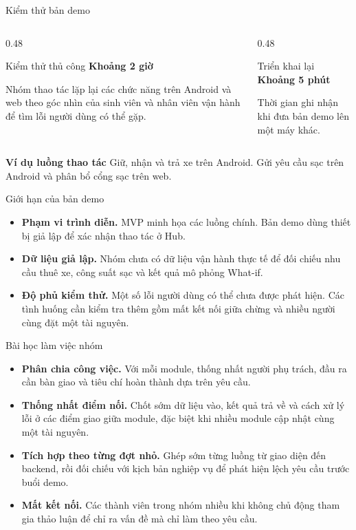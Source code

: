 \documentclass[aspectratio=169]{beamer}
\begin{document}
\begin{frame}{Kiểm thử bản demo}
  \begin{columns}[T,onlytextwidth]
    \begin{column}{0.48\textwidth}
      \begin{block}{Kiểm thử thủ công}
        {\LARGE\bfseries Khoảng 2 giờ}\par\medskip
        Nhóm thao tác lặp lại các chức năng trên Android và web theo góc nhìn của sinh viên và nhân viên vận hành để tìm lỗi người dùng có thể gặp.
      \end{block}
    \end{column}
    \begin{column}{0.48\textwidth}
      \begin{block}{Triển khai lại}
        {\LARGE\bfseries Khoảng 5 phút}\par\medskip
        Thời gian ghi nhận khi đưa bản demo lên một máy khác.
      \end{block}
    \end{column}
  \end{columns}
  \medskip
  \textbf{Ví dụ luồng thao tác} \enspace Giữ, nhận và trả xe trên Android. Gửi yêu cầu sạc trên Android và phân bổ cổng sạc trên web.
\end{frame}

\begin{frame}{Giới hạn của bản demo}
  \begin{itemize}
    \setlength{\itemsep}{1em}
    \item \textbf{Phạm vi trình diễn.} MVP minh họa các luồng chính. Bản demo dùng thiết bị giả lập để xác nhận thao tác ở Hub.
    \item \textbf{Dữ liệu giả lập.} Nhóm chưa có dữ liệu vận hành thực tế để đối chiếu nhu cầu thuê xe, công suất sạc và kết quả mô phỏng What-if.
    \item \textbf{Độ phủ kiểm thử.} Một số lỗi người dùng có thể chưa được phát hiện. Các tình huống cần kiểm tra thêm gồm mất kết nối giữa chừng và nhiều người cùng đặt một tài nguyên.
  \end{itemize}
\end{frame}

\begin{frame}{Bài học làm việc nhóm}
  \begin{itemize}
    \setlength{\itemsep}{1em}
    \item \textbf{Phân chia công việc.} Với mỗi module, thống nhất người phụ trách, đầu ra cần bàn giao và tiêu chí hoàn thành dựa trên yêu cầu.
    \item \textbf{Thống nhất điểm nối.} Chốt sớm dữ liệu vào, kết quả trả về và cách xử lý lỗi ở các điểm giao giữa module, đặc biệt khi nhiều module cập nhật cùng một tài nguyên.
    \item \textbf{Tích hợp theo từng đợt nhỏ.} Ghép sớm từng luồng từ giao diện đến backend, rồi đối chiếu với kịch bản nghiệp vụ để phát hiện lệch yêu cầu trước buổi demo.
    \item \textbf{Mất kết nối.} Các thành viên trong nhóm nhiều khi không chủ động tham gia thảo luận để chỉ ra vấn đề mà chỉ làm theo yêu cầu.
  \end{itemize}
\end{frame}
\end{document}
